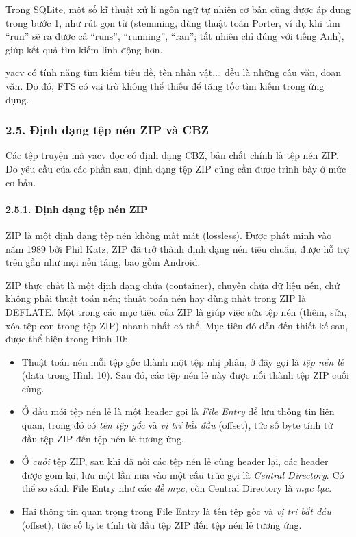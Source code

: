 \documentclass[
]{article}
\providecommand{\tightlist}{%
  \setlength{\itemsep}{0pt}\setlength{\parskip}{0pt}}
\begin{document}
Trong SQLite, một số kĩ thuật xử lí ngôn ngữ tự nhiên cơ bản cũng được
áp dụng trong bước 1, như rút gọn từ (stemming, dùng thuật toán Porter,
ví dụ khi tìm ``run'' sẽ ra được cả ``runs'', ``running'', ``ran''; tất
nhiên chỉ đúng với tiếng Anh), giúp kết quả tìm kiếm linh động hơn.

yacv có tính năng tìm kiếm tiêu đề, tên nhân vật,\ldots{} đều là những
câu văn, đoạn văn. Do đó, FTS có vai trò không thể thiếu để tăng tốc tìm
kiếm trong ứng dụng.

\hypertarget{ux111ux1ecbnh-dux1ea1ng-tux1ec7p-nuxe9n-zip-vuxe0-cbz}{%
\subsubsection{\texorpdfstring{2.5. Định dạng tệp nén ZIP và CBZ
}{2.5. Định dạng tệp nén ZIP và CBZ }}\label{ux111ux1ecbnh-dux1ea1ng-tux1ec7p-nuxe9n-zip-vuxe0-cbz}}

Các tệp truyện mà yacv đọc có định dạng CBZ, bản chất chính là tệp nén
ZIP. Do yêu cầu của các phần sau, định dạng tệp ZIP cũng cần được trình
bày ở mức cơ bản.

\hypertarget{ux111ux1ecbnh-dux1ea1ng-tux1ec7p-nuxe9n-zip}{%
\paragraph{\texorpdfstring{2.5.1. Định dạng tệp nén ZIP
}{2.5.1. Định dạng tệp nén ZIP }}\label{ux111ux1ecbnh-dux1ea1ng-tux1ec7p-nuxe9n-zip}}

ZIP là một định dạng tệp nén không mất mát (lossless). Được phát minh
vào năm 1989 bởi Phil Katz, ZIP đã trở thành định dạng nén tiêu chuẩn,
được hỗ trợ trên gần như mọi nền tảng, bao gồm Android.

ZIP thực chất là một định dạng chứa (container), chuyên chứa dữ liệu
nén, chứ không phải thuật toán nén; thuật toán nén hay dùng nhất trong
ZIP là DEFLATE. Một trong các mục tiêu của ZIP là giúp việc sửa tệp nén
(thêm, sửa, xóa tệp con trong tệp ZIP) nhanh nhất có thể. Mục tiêu đó
dẫn đến thiết kế sau, được thể hiện trong Hình 10:

\begin{itemize}
\tightlist
\item
  Thuật toán nén mỗi tệp gốc thành một tệp nhị phân, ở đây gọi là
  \emph{tệp nén lẻ} (data trong Hình 10). Sau đó, các tệp nén lẻ này
  được nối thành tệp ZIP cuối cùng.
\item
  Ở đầu mỗi tệp nén lẻ là một header gọi là \emph{File Entry} để lưu
  thông tin liên quan, trong đó có \emph{tên tệp gốc} và \emph{vị trí
  bắt đầu} (offset), tức số byte tính từ đầu tệp ZIP đến tệp nén lẻ
  tương ứng.
\item
  Ở \emph{cuối} tệp ZIP, sau khi đã nối các tệp nén lẻ cùng header lại,
  các header được gom lại, lưu một lần nữa vào một cấu trúc gọi là
  \emph{Central Directory}. Có thể so sánh File Entry như các \emph{đề
  mục}, còn Central Directory là \emph{mục lục}.
\item
  Hai thông tin quan trọng trong File Entry là tên tệp gốc và \emph{vị
  trí bắt đầu} (offset), tức số byte tính từ đầu tệp ZIP đến tệp nén lẻ
  tương ứng.
\end{itemize}
\end{document}
